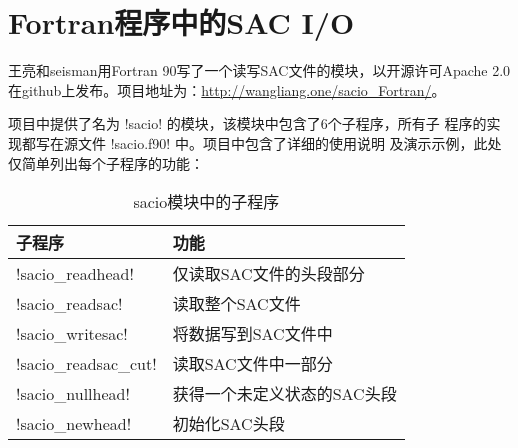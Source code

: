 \section{Fortran程序中的SAC I/O}
王亮和seisman用Fortran 90写了一个读写SAC文件的模块，以开源许可Apache 2.0
在github上发布。项目地址为：\url{http://wangliang.one/sacio_Fortran/}。

项目中提供了名为 !sacio! 的模块，该模块中包含了6个子程序，所有子
程序的实现都写在源文件 !sacio.f90! 中。项目中包含了详细的使用说明
及演示示例，此处仅简单列出每个子程序的功能：

\begin{table}[H]
\centering
\caption{sacio模块中的子程序}
\label{table:sacio_Fortran}
\begin{tabular}{ll}
\toprule
子程序      &   功能        \\
\midrule
!sacio_readhead!      &   仅读取SAC文件的头段部分 \\
!sacio_readsac!       &   读取整个SAC文件 \\
!sacio_writesac!      &   将数据写到SAC文件中 \\
!sacio_readsac_cut!   &   读取SAC文件中一部分 \\
!sacio_nullhead!      &   获得一个未定义状态的SAC头段\\
!sacio_newhead!       &   初始化SAC头段\\
\bottomrule
\end{tabular}
\end{table}
